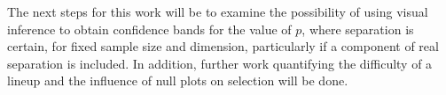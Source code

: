 %

The next steps for this work will be to examine the possibility of using visual inference to obtain confidence bands for the value of $p$, where separation is certain, for fixed sample size and dimension, particularly if a component of real separation is included. In addition, further work quantifying the difficulty of a lineup and the influence of null plots on selection will be done. 


